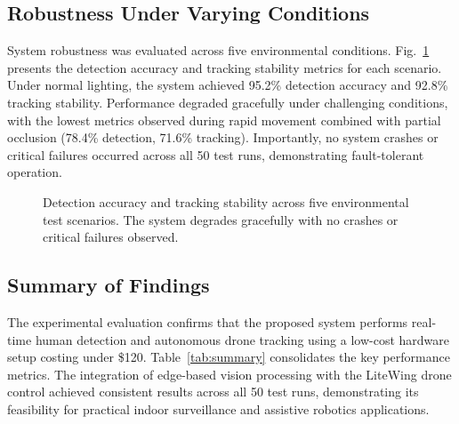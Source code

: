 \documentclass[conference]{IEEEtran}
\begin{document}
\subsection{Robustness Under Varying Conditions}

System robustness was evaluated across five environmental conditions. Fig.~\ref{fig:robustness} presents the detection accuracy and tracking stability metrics for each scenario. Under normal lighting, the system achieved 95.2\% detection accuracy and 92.8\% tracking stability. Performance degraded gracefully under challenging conditions, with the lowest metrics observed during rapid movement combined with partial occlusion (78.4\% detection, 71.6\% tracking). Importantly, no system crashes or critical failures occurred across all 50 test runs, demonstrating fault-tolerant operation.

\begin{figure}[!t]
\centering
{}
\caption{Detection accuracy and tracking stability across five environmental test scenarios. The system degrades gracefully with no crashes or critical failures observed.}
\label{fig:robustness}
\end{figure}

\subsection{Summary of Findings}

The experimental evaluation confirms that the proposed system performs real-time human detection and autonomous drone tracking using a low-cost hardware setup costing under \$120. Table~\ref{tab:summary} consolidates the key performance metrics. The integration of edge-based vision processing with the LiteWing drone control achieved consistent results across all 50 test runs, demonstrating its feasibility for practical indoor surveillance and assistive robotics applications.
\end{document}
